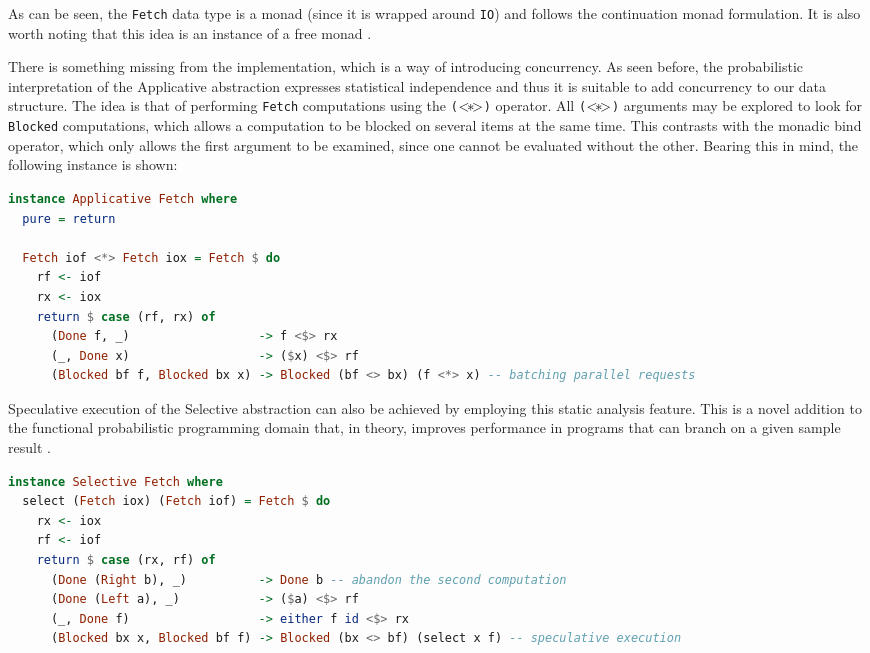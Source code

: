 \documentclass[
  oneside,
  11pt, a4paper,
  footinclude=true,
  headinclude=true,
  cleardoublepage=empty
]{scrbook}
\theoremstyle{definition}
\theoremstyle{definition}
\def\ap{\mathbin{{<\hskip-1ex*\hskip-1ex>}}}
\begin{document}
As can be seen, the \texttt{Fetch} data type is a monad (since it is wrapped around \texttt{IO}) and follows the continuation monad formulation. It is also worth noting that this idea is an instance of a free monad \citep{Marlow:2014:NFA:2692915.2628144}.

There is something missing from the implementation, which is a way of introducing concurrency. As seen before, the probabilistic interpretation of the Applicative abstraction expresses statistical independence and thus it is suitable to add concurrency to our data structure. The idea is that of performing \texttt{Fetch} computations using the \texttt{($\ap$)} operator. All \texttt{($\ap$)} arguments may be explored to look for \texttt{Blocked} computations, which allows a computation to be blocked on several items at the same time. This contrasts with the monadic bind operator, which only allows the first argument to be examined, since one cannot be evaluated without the other. Bearing this in mind, the following instance is shown:

    \begin{lstlisting}[language=Haskell, caption={Fetch Applicative instance},captionpos=b]
instance Applicative Fetch where
  pure = return

  Fetch iof <*> Fetch iox = Fetch $ do
    rf <- iof
    rx <- iox
    return $ case (rf, rx) of
      (Done f, _)                  -> f <$> rx
      (_, Done x)                  -> ($x) <$> rf
      (Blocked bf f, Blocked bx x) -> Blocked (bf <> bx) (f <*> x) -- batching parallel requests
    \end{lstlisting}
    
Speculative execution of the Selective abstraction can also be achieved by employing this static analysis feature. This is a novel addition to the functional probabilistic programming domain that, in theory, improves performance in programs that can branch on a given sample result \citep{andrey2019selective}.

    \begin{lstlisting}[language=Haskell, caption={Fetch Selective instance},captionpos=b]
instance Selective Fetch where
  select (Fetch iox) (Fetch iof) = Fetch $ do
    rx <- iox
    rf <- iof
    return $ case (rx, rf) of
      (Done (Right b), _)          -> Done b -- abandon the second computation
      (Done (Left a), _)           -> ($a) <$> rf
      (_, Done f)                  -> either f id <$> rx
      (Blocked bx x, Blocked bf f) -> Blocked (bx <> bf) (select x f) -- speculative execution
    \end{lstlisting}
    
\end{document}
